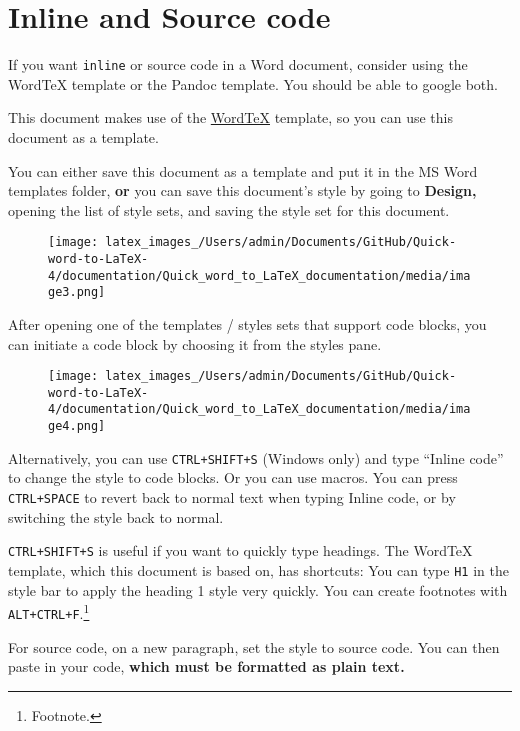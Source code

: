 \documentclass[12pt]{article}
\theoremstyle{plain}
\theoremstyle{remark}
\theoremstyle{definition}
\begin{document}
\section{Inline and Source code}

If you want \texttt{inline} or source code in a Word document, consider
using the WordTeX template or the Pandoc template. You should be able to
google both.

This document makes use of the
\href{https://www.youtube.com/watch?v=jlX_pThh7z8/}{WordTeX} template,
so you can use this document as a template.

You can either save this document as a template and put it in the MS
Word templates folder, \textbf{or} you can save this document's style by
going to \textbf{Design,} opening the list of style sets, and saving the
style set for this document.


\begin{figure}[H]
\centering
\texttt{[image: latex\_images\_/Users/admin/Documents/GitHub/Quick-word-to-LaTeX-4/documentation/Quick\_word\_to\_LaTeX\_documentation/media/image3.png]}
\end{figure}


After opening one of the templates / styles sets that support code
blocks, you can initiate a code block by choosing it from the styles
pane.


\begin{figure}[H]
\centering
\texttt{[image: latex\_images\_/Users/admin/Documents/GitHub/Quick-word-to-LaTeX-4/documentation/Quick\_word\_to\_LaTeX\_documentation/media/image4.png]}
\end{figure}


Alternatively, you can use \texttt{CTRL+SHIFT+S} (Windows only) and type
``Inline code'' to change the style to code blocks. Or you can use
macros. You can press \texttt{CTRL+SPACE} to revert back to normal text
when typing Inline code, or by switching the style back to normal.

\texttt{CTRL+SHIFT+S} is useful if you want to quickly
type headings. The WordTeX template, which this document is based on,
has shortcuts: You can type \texttt{H1} in the style bar to apply the
heading 1 style very quickly. You can create footnotes with
\texttt{ALT+CTRL+F}.\footnote{Footnote.}

For source code, on a new paragraph, set the style to source code. You
can then paste in your code, \textbf{which must be formatted as plain
text.}
\end{document}
